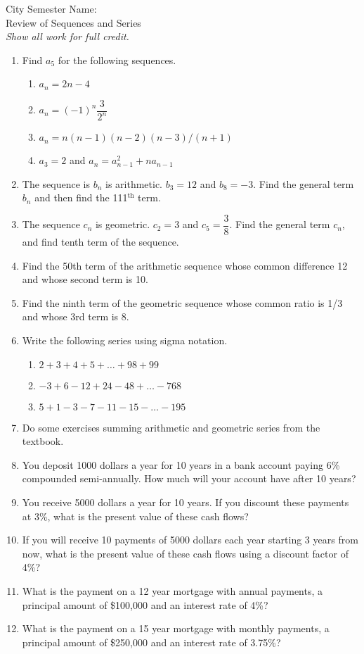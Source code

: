 \documentclass[12pt]{article}
\theoremstyle{plain}     %
\begin{document}
\large
City Semester  \hspace{8cm} Name:\makebox[6cm]{\hrulefill}
\\
Review of Sequences and Series\\
\normalsize 
\emph{Show all work for full credit.}
\begin{enumerate}
	\item Find $a_5$ for the following sequences.
		\begin{enumerate}
			\item $a_n=2n-4$
			\item $a_n=(-1)^n \dfrac{3}{2^n}$
			\item $a_n=n(n-1)(n-2)(n-3)/(n+1)$
			\item $a_3=2$ and $a_n=a_{n-1}^2+na_{n-1}$
		\end{enumerate}
	\item The sequence is $b_n$ is arithmetic. $b_3=12$ and $b_8=-3$. Find the general term $b_n$ and then find the 111$^{\text{th}}$ term.	
	\item The sequence $c_n$ is geometric. $c_2=3$ and $c_5=\dfrac{3}{8}$. Find the general term $c_n$, and find tenth term of the sequence.
	\item Find the 50th term of the arithmetic sequence whose common difference 12 and whose second term is 10.
	\item Find the ninth term of the geometric sequence whose common ratio is 1/3 and whose 3rd term is 8.
	\item Write the following series using sigma notation.
		\begin{enumerate}
			\item $2+3+4+5+\ldots +98+99$
			\item $-3 + 6 -12+24-48+\ldots -768$
			\item $5+1-3-7-11-15-\ldots -195$
		\end{enumerate}
	\item Do some exercises summing arithmetic and geometric series from the textbook.
	\item You deposit 1000 dollars a year for 10 years in a bank account paying 6\% compounded semi-annually. How much will your account have after 10 years?
	\item You receive 5000 dollars a year for 10 years. If you discount these payments at 3\%, what is the present value of these cash flows?
	\item If you will receive 10 payments of 5000 dollars each year starting 3 years from now, what is the present value of these cash flows using a discount factor of 4\%?
	\item What is the payment on a 12 year mortgage with annual payments, a principal amount of \$100,000 and an interest rate of 4\%?
	\item What is the payment on a 15 year mortgage with monthly payments, a principal amount of \$250,000 and an interest rate of 3.75\%?
\end{enumerate}
	
\end{document}
